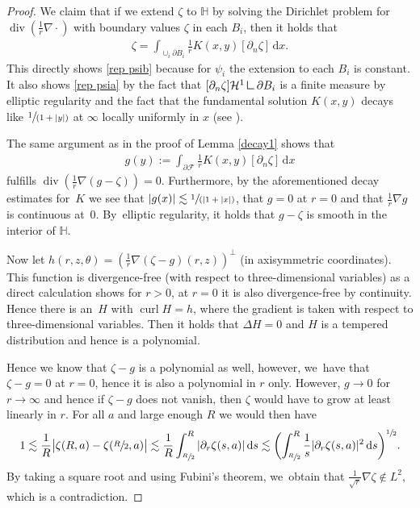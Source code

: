 \documentclass[10pt]{amsart}
\newcommand{\spfrac}[2]{\sfrac{#1}{(#2)}}
\theoremstyle{definition}
\renewcommand{\div}{\operatorname{div}}
\DeclareMathOperator{\curl}{curl}
\newcommand\eq{=}
\newcommand\dd{\,\mathrm{d}}
\newcommand\dx{\dd x}
\newcommand\ds{\dd s}
\newcommand{\mres}{\mathbin{\vrule height 1.6ex depth 0pt width
0.13ex\vrule height 0.13ex depth 0pt width 1.3ex}}
\let\de\partial
\begin{document}
\begin{proof}
We claim that if we extend $\zeta$ to $\mathbb{H}$ by solving the Dirichlet problem for $\div(\frac{1}{r}\nabla\cdot)$ with boundary values $\zeta$ in each $B_i$, then it holds that
\begin{align*}
\zeta\eq \int_{\cup_i\de B_i}\frac{1}{r}K(x,y)[\de_n\zeta]\dx.
\end{align*}
This directly shows \eqref{rep psib} because for $\psi_i$ the extension to each $B_i$ is constant. It also shows \eqref{rep psia} by the fact that $[\de_n\zeta]\mathcal{H}^1\mres \de B_i$ is a finite measure by elliptic regularity and the fact that the fundamental solution $K(x,y)$ decays like $\spfrac{1}{1+|y|}$ at $\infty$ locally uniformly in $x$ (see \cite[Lem.\,2.1\,ii)]{GallaySverak}).

The same argument as in the proof of Lemma \ref{decay1} shows that
\begin{align*}
g(y):=\int_{\de\mathcal{F}}\frac{1}{r}K(x,y)[\de_n\zeta]\dx
\end{align*}
fulfills $\div(\frac{1}{r}\nabla (g-\zeta))=0$. Furthermore, by the aforementioned decay estimates for~$K$ we see that $|g(x)|\lesssim \spfrac{1}{|1+|x|}$, that $g=0$ at $r=0$ and that $\frac{1}{r}\nabla g$ is continuous at~$0$. By~elliptic regularity, it holds that $g-\zeta$ is smooth in the interior of $\mathbb{H}$.

Now let $h(r,z,\theta)=(\frac{1}{r}\nabla(\zeta-g)(r,z))^\perp$ (in axisymmetric coordinates). This function is divergence-free (with respect to three-dimensional variables) as a direct calculation shows for $r>0$, at $r=0$ it is also divergence-free by continuity.
Hence there is an~$H$ with $\curl H=h$, where the gradient is taken with respect to three-dimensional variables. Then it holds that $\Delta H=0$ and $H$ is a tempered distribution and hence is a polynomial.

Hence we know that $\zeta-g$ is a polynomial as well, however, we~have that $\zeta-g=0$ at $r=0$, hence it is also a polynomial in $r$ only. However, $g\to 0$ for $r\to \infty$ and hence if $\zeta-g$ does not vanish, then $\zeta$ would have to grow at least linearly in $r$. For all $a$ and large enough $R$ we would then have
\begin{align*}
1\lesssim \frac{1}{R}\bigl|\zeta(R,a)-\zeta(\sfrac{R}{2},a)\bigr|\lesssim \frac{1}{R}\int_{\sfrac{R}{2}}^R|\de_r\zeta(s,a)|\ds\lesssim \biggl(\int_{\sfrac{R}{2}}^R\frac{1}{s}|\de_r\zeta(s,a)|^2\ds\biggr)^{\sfrac{1}{2}}.
\end{align*}
By taking a square root and using Fubini's theorem, we~obtain that $\frac{1}{\sqrt{r}}\nabla\zeta\notin L^2$, which is a contradiction.
\end{proof}
\end{document}
